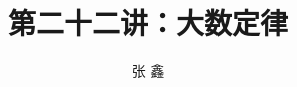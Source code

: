 

\title[概率论]{第二十二讲：大数定律}
\author[张鑫{\rm Email: x.zhang.seu@foxmail.com} ]{\large 张 鑫}
\date{}


{ 
	\begin{frame}
		\titlepage
	\end{frame}
}

